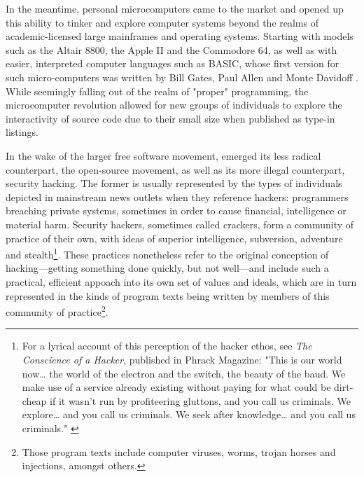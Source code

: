 In the meantime, personal microcomputers came to the market and opened up this ability to tinker and explore computer systems beyond the realms of academic-licensed large mainframes and operating systems. Starting with models such as the Altair 8800, the Apple II and the Commodore 64, as well as with easier, interpreted computer languages such as BASIC, whose first version for such micro-computers was written by Bill Gates, Paul Allen and Monte Davidoff \citep{montfort_10_2014}. While seemingly falling out of the realm of "proper" programming, the microcomputer revolution allowed for new groups of individuals to explore the interactivity of source code due to their small size when published as type-in listings.

In the wake of the larger free software movement, emerged its less radical counterpart, the open-source movement, as well as its more illegal counterpart, security hacking. The former is usually represented by the types of individuals depicted in mainstream news outlets when they reference hackers: programmers breaching private systems, sometimes in order to cause financial, intelligence or material harm. Security hackers, sometimes called crackers, form a community of practice of their own, with ideas of superior intelligence, subversion, adventure and stealth\footnote{For a lyrical account of this perception of the hacker ethos, see \emph{The Conscience of a Hacker}, published in Phrack Magazine: "This is our world now\dots{} the world of the electron and the switch, the beauty of the baud.  We make use of a service already existing without paying for what could be dirt-cheap if it wasn't run by profiteering gluttons, and you call us criminals.  We explore\dots{} and you call us criminals.  We seek after knowledge\dots{} and you call us criminals." \citep{mentor+++_conscience_1986}}. These practices nonetheless refer to the original conception of hacking—getting something done quickly, but not well—and include such a practical, efficient appoach into its own set of values and ideals, which are in turn represented in the kinds of program texts being written by members of this community of practice\footnote{Those program texts include computer viruses, worms, trojan horses and injections, amongst others.}.

